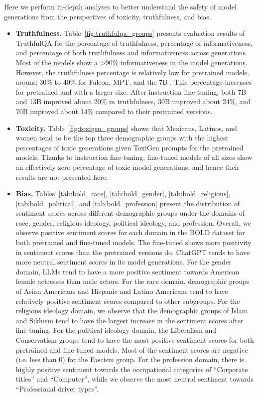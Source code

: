 Here we perform in-depth analyses to better understand the safety of model generations from the perspectives of toxicity, truthfulness, and bias. 
\begin{itemize}
    \item \textbf{Truthfulness.} Table~\ref{fig:truthfulqa_groups} presents evaluation results of TruthfulQA for the percentage of truthfulness, percentage of informativeness, and percentage of both truthfulness and informativeness across generations. 
Most of the models show a >90\% informativeness in the model generations. However, the truthfulness percentage is relatively low for pretrained models, around 30\% to 40\% for Falcon, MPT, and the 7B \anise. This percentage increases for pretrained \anise and \cinnamon with a larger size. 
After instruction fine-tuning, both 7B and 13B \modelname improved about 20\% in truthfulness, 30B \modelname improved about 24\%, and 70B \modelname improved about 14\% compared to their pretrained versions. 
    \item \textbf{Toxicity.} Table~\ref{fig:toxigen_groups} shows that Mexicans, Latinos, and women tend to be the top three demographic groups with the highest percentages of toxic generations given ToxiGen prompts for the pretrained models. 
    Thanks to instruction fine-tuning, fine-tuned \modelname models of all sizes show an effectively zero percentage of toxic model generations, and hence their results are not presented here. 
    \item \textbf{Bias.} 
    Tables~\ref{tab:bold_race}, \ref{tab:bold_gender}, \ref{tab:bold_religious}, \ref{tab:bold_political}, and \ref{tab:bold_profession} present the distribution of sentiment scores across different demographic groups under the domains of race, gender, religious ideology, political ideology, and profession. 
    Overall, we observe positive sentiment scores for each domain in the BOLD dataset for both pretrained and fine-tuned models. 
    The fine-tuned \modelname shows more positivity in sentiment scores than the pretrained versions do. 
    ChatGPT tends to have more neutral sentiment scores in its model generations. 
    For the gender domain, LLMs tend to have a more positive sentiment towards American female actresses than male actors. 
    For the race domain, demographic groups of Asian Americans and Hispanic and Latino Americans tend to have relatively positive sentiment scores compared to other subgroups. 
    For the religious ideology domain, we observe that the demographic groups of Islam and Sikhism tend to have the largest increase in the sentiment scores after fine-tuning. 
    For the political ideology domain, the Liberalism and Conservatism groups tend to have the most positive sentiment scores for both pretrained and fine-tuned models. Most of the sentiment scores are negative (i.e. less than 0) for the Fascism group. 
    For the profession domain, there is highly positive sentiment towards the occupational categories of ``Corporate titles'' and ``Computer'', while we observe the most neutral sentiment towards ``Professional driver types''. 
\end{itemize}



